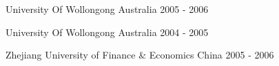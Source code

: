 
\begin{cventries}
  {University Of Wollongong} %
  {Australia} %
  {2005 - 2006} %
  {}

  {University Of Wollongong} %
  {Australia} %
  {2004 - 2005} %
  {}

  {Zhejiang University of Finance \& Economics} %
  {China} %
  {2005 - 2006} %
  {}

\end{cventries}